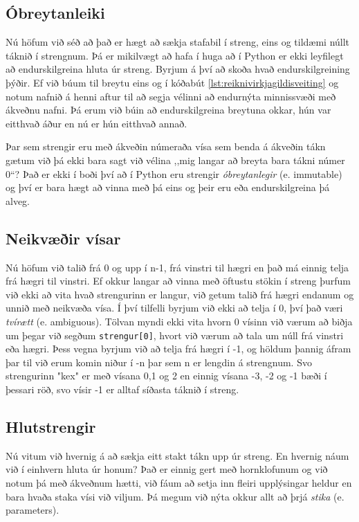\subsection{Óbreytanleiki}
Nú höfum við séð að það er hægt að sækja stafabil í streng, eins og tildæmi núllt táknið í strengnum.
Þá er mikilvægt að hafa í huga að í Python er ekki leyfilegt að endurskilgreina hluta úr streng.
Byrjum á því að skoða hvað endurskilgreining þýðir.
Ef við búum til breytu eins og í kóðabút \ref{lst:reiknivirkjagildisveiting} og notum nafnið á henni aftur til að segja vélinni að endurnýta minnissvæði með ákveðnu nafni.
Þá erum við búin að endurskilgreina breytuna okkar, hún var eitthvað áður en nú er hún eitthvað annað.

Þar sem strengir eru með ákveðin númeraða vísa sem benda á ákveðin tákn gætum við þá ekki bara sagt við vélina ,,mig langar að breyta bara tákni númer 0“?
Það er ekki í boði því að í Python eru strengir \emph{óbreytanlegir} (e. immutable) og því er bara hægt að vinna með þá eins og þeir eru eða endurskilgreina þá alveg.

\subsection{Neikvæðir vísar}
Nú höfum við talið frá 0 og upp í n-1, frá vinstri til hægri en það má einnig telja frá hægri til vinstri.
Ef okkur langar að vinna með öftustu stökin í streng þurfum við ekki að vita hvað strengurinn er langur, við getum talið frá hægri endanum og unnið með neikvæða vísa.
Í því tilfelli byrjum við ekki að telja í 0, því það væri \emph{tvírætt} (e. ambiguous).
Tölvan myndi ekki vita hvorn 0 vísinn við værum að biðja um þegar við segðum \texttt{strengur[0]}, hvort við værum að tala um núll frá vinstri eða hægri.
Þess vegna byrjum við að telja frá hægri í -1, og höldum þannig áfram þar til við erum komin niður í -n þar sem n er lengdin á strengnum.
Svo strengurinn "kex" er með vísana 0,1 og 2 en einnig vísana -3, -2 og -1 bæði í þessari röð, svo vísir -1 er alltaf síðasta táknið í streng.

\subsection{Hlutstrengir}
Nú vitum við hvernig á að sækja eitt stakt tákn upp úr streng.
En hvernig náum við í einhvern hluta úr honum?
Það er einnig gert með hornklofunum og við notum þá með ákveðnum hætti, við fáum að setja inn fleiri upplýsingar heldur en bara hvaða staka vísi við viljum.
Þá megum við nýta okkur allt að þrjá \emph{stika} (e. parameters).

